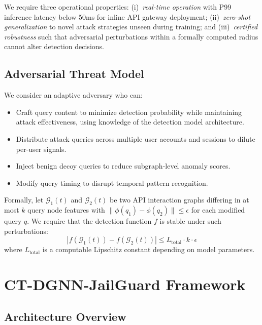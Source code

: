\documentclass[journal]{IEEEtran}
\newcommand{\G}{\mathcal{G}}
\theoremstyle{plain}
\theoremstyle{definition}
\theoremstyle{remark}
\begin{document}
We require three operational properties: (i)~\textit{real-time operation} with P99 inference latency below 50ms for inline API gateway deployment; (ii)~\textit{zero-shot generalization} to novel attack strategies unseen during training; and (iii)~\textit{certified robustness} such that adversarial perturbations within a formally computed radius cannot alter detection decisions.

\subsection{Adversarial Threat Model}

We consider an adaptive adversary who can:
\begin{itemize}
\item Craft query content to minimize detection probability while maintaining attack effectiveness, using knowledge of the detection model architecture.
\item Distribute attack queries across multiple user accounts and sessions to dilute per-user signals.
\item Inject benign decoy queries to reduce subgraph-level anomaly scores.
\item Modify query timing to disrupt temporal pattern recognition.
\end{itemize}

Formally, let $\G_1(t)$ and $\G_2(t)$ be two API interaction graphs differing in at most $k$ query node features with $\|\phi(q_1) - \phi(q_2)\| \leq \epsilon$ for each modified query $q$. We require that the detection function $f$ is stable under such perturbations:
\begin{equation}
|f(\G_1(t)) - f(\G_2(t))| \leq L_{\text{total}} \cdot k \cdot \epsilon
\end{equation}
where $L_{\text{total}}$ is a computable Lipschitz constant depending on model parameters.

\section{CT-DGNN-JailGuard Framework}
\label{sec:framework}

\subsection{Architecture Overview}
\end{document}
